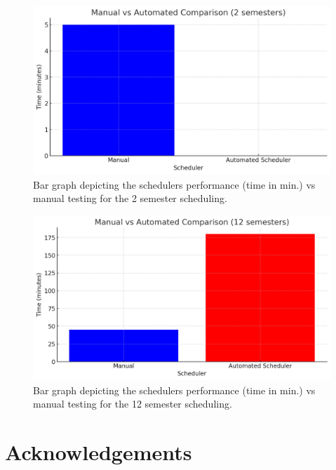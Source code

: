 \documentclass[12pt]{article}
\begin{document}

    \begin{figure}[h!]
        \centering
        \includegraphics[scale=0.5]{figures/eval/bar-graph-2sem.png}
        \caption{Bar graph depicting the schedulers performance (time in min.) vs manual testing for the 2 semester scheduling.}
        \label{fig:2sem}
    \end{figure}

    \begin{figure}[h!]
        \centering
        \includegraphics[scale=0.5]{figures/eval/bar-graph-12sem.png}
        \caption{Bar graph depicting the schedulers performance (time in min.) vs manual testing for the 12 semester scheduling.}
        \label{fig:12sem}
    \end{figure}

    \newpage
    
    \section{Acknowledgements}
    \label{sec:ack}
\end{document}
